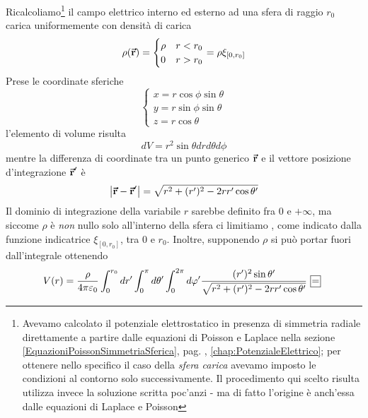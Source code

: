 \begin{examplewt}
	Ricalcoliamo\footnote{Avevamo calcolato il potenziale elettrostatico in presenza di simmetria radiale direttamente a partire dalle equazioni di Poisson e Laplace nella sezione \ref{EquazioniPoissonSimmetriaSferica}, pag. \pageref{EquazioniPoissonSimmetriaSferica}, \autoref{chap:PotenzialeElettrico}; per ottenere nello specifico il caso della \textit{sfera carica}  avevamo imposto le condizioni al contorno solo successivamente. Il procedimento qui scelto risulta utilizza invece la soluzione scritta poc'anzi - ma di fatto l'origine è anch'essa dalle equazioni di Laplace e Poisson} il campo elettrico interno ed esterno ad una sfera di raggio $r_0$ carica uniformemente con densità di carica
	\begin{equation*}
		\rho(\vb*{\va{r}})=
		\begin{cases}
			\rho & r<r_0\\
			0 & r>r_0
			\end{cases}=\rho\xi_{[0,r_0]}
	\end{equation*}
	Prese le coordinate sferiche
	\begin{equation*}
		\begin{cases}
			x=r\cos\phi\sin\theta\\
			y=r\sin\phi\sin\theta\\
			z=r\cos\theta
		\end{cases}
	\end{equation*}
	l'elemento di volume risulta
	\begin{equation*}
		dV=r^2\sin\theta drd\theta d\phi
	\end{equation*}
	mentre la differenza di coordinate tra un punto generico $\vb*{\va{r}}$ e il vettore posizione d'integrazione  $\vb*{\va{r}}'$ è
	\begin{equation*}
		\abs{\vb*{\va{r}}-\vb*{\va{r}}'}=\sqrt{r^2+(r')^2-2rr'\cos\theta '}
	\end{equation*}
	Il dominio di integrazione della variabile $r$ sarebbe definito fra $0$ e $+\infty$, ma siccome $\rho$ è \textit{non} nullo solo all'interno della sfera ci limitiamo , come indicato dalla funzione indicatrice $\xi_{[0,r_0]}$, tra $0$ e $r_0$. Inoltre, supponendo $\rho$ si può portar fuori dall'integrale ottenendo
	\begin{equation*}
		V(r)=\frac{\rho}{4\pi\epsilon_0}\int^{r_0}_0dr' \int^\pi_0 d\theta' \int^{2\pi}_0 d\phi' \frac{(r')^2 \sin\theta '}{\sqrt{r^2+(r')^2 -2rr'\cos\theta '}}\squarequal	
	\end{equation*}

\end{examplewt}
